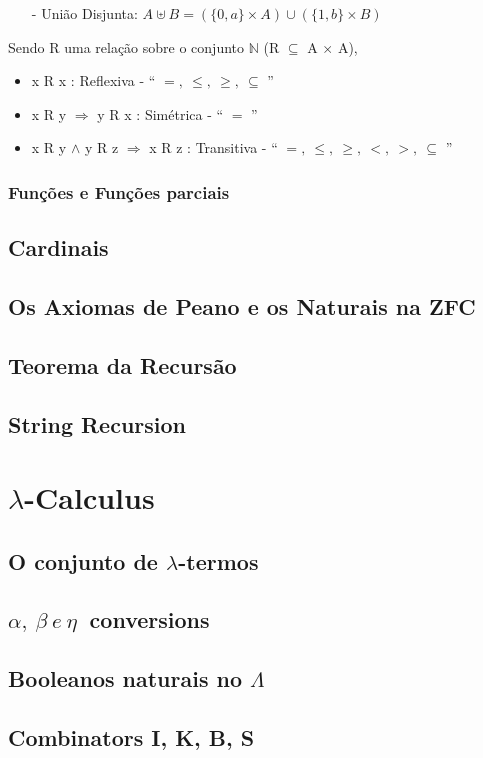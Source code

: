\documentclass[12pt, a4paper]{article}
\begin{document}
				\begin{itemize}
				\item[-] Uni\~ao Disjunta: $A \uplus B = (\{0,a\} \times A) \cup (\{1,b\} \times B)$				
				\end{itemize}


				Sendo R uma rela\c{c}\~ao sobre o conjunto $\mathbb{N}$ (R $\subseteq$ A $\times$ A),
				\begin{itemize}
				\item x R x : Reflexiva - `` $ =, ~\leq, ~\geq, ~\subseteq $ ''
				\item x R y $\Rightarrow $ y R x  : Sim\'etrica - `` $ = $  ''
				\item x R y $\land$ y R z $\Rightarrow$ x R z : Transitiva -  `` $ =, ~\leq, ~\geq, ~<, ~>, ~\subseteq $ ''
				\end{itemize}

			\subsubsection{Fun\c{c}\~oes e Fun\c{c}\~oes parciais}

		\subsection{Cardinais}
		\subsection{Os Axiomas de Peano e os Naturais na ZFC}
		\subsection{Teorema da Recurs\~ao}
		\subsection{String Recursion}

	\section{$\lambda$-Calculus}
		\subsection{O conjunto de $\lambda$-termos}
		\subsection{$\alpha,~ \beta~ e~ \eta~$ conversions}
		\subsection{Booleanos naturais no $\Lambda$}
		\subsection{Combinators I, K, B, S}
\end{document}
